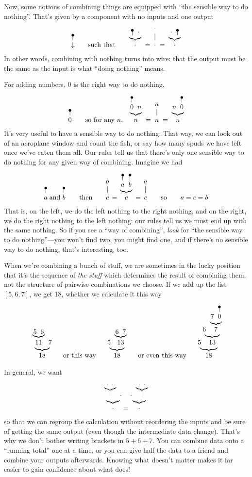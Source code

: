 \documentclass{book}
\begin{document}
Now, some notions of combining things are equipped with ``the sensible way to do nothing''. That's given by a component with no inputs and one output
\[
\naw{\downarrow}
\qquad\mbox{such that}\qquad
\wye{\naw{}}\cdot\cdot \;=\; \wid\cdot \;=\;\wye\cdot{\naw{}}\cdot
\]
In other words, combining with nothing turns into wire: that the output must be the same as the input is what ``doing nothing'' means.

For adding numbers, 0 is the right way to do nothing,
\[
\naw{0}
\qquad\mbox{so for any $n$,}\quad
\wye{\naw{0}}nn \;=\; \wid n \;=\;\wye n{\naw{0}}n
\]
It's very useful to have a sensible way to do nothing. That way, we can look out of an aeroplane window and count the fish, or say how many spuds we have left once we've eaten them all. Our rules tell us that there's only one sensible way to do nothing for any given way of combining. Imagine we had
\[
\naw{a} \; \mbox{and}\; \naw{b}
\qquad\mbox{then}\qquad
\wir bc\,=\,\wye{\naw{a}}{\naw{b}}c\,=\,\wir ac
\qquad\mbox{so}\qquad a = c = b
\]
That is, on the left, we do the left nothing to the right nothing, and on the right, we do the right nothing to the left nothing: our rules tell us we must end up with the same nothing. So if you see a ``way of combining'', \emph{look} for ``the sensible way to do nothing''---you won't find two, you might find one, and if there's no sensible way to do nothing, that's interesting, too.

When we're combining a bunch of stuff, we are sometimes in the lucky position that it's the sequence of \emph{the stuff} which determines the result of combining them, not the structure of pairwise combinations we choose. If we add up the list $[5,6,7]$, we get $18$, whether we calculate it this way
\[
\wye{\wye56{11}}7{18}
\qquad\mbox{or this way}\qquad
\wye5{\wye67{13}}{18}
\qquad\mbox{or even this way}\qquad
\wye5{\wye6{\wye7{\naw0}7}{13}}{18}
\]

In general, we want
\[
\wye{\wye\cdot\cdot\mid}\cdot\cdot \;=\; \wye\cdot{\wye\cdot\cdot\mid}\cdot
\]
so that we can regroup the calculation without reordering the inputs and be sure of getting the same output (even though the intermediate data change). That's why we don't bother writing brackets in $5+6+7$. You can combine data onto a ``running total'' one at a time, or you can give half the data to a friend and combine your outputs afterwards. Knowing what doesn't matter makes it far easier to gain confidence about what does!
\end{document}
